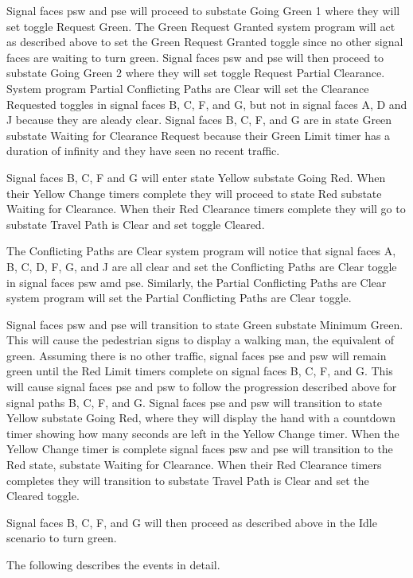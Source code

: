 \documentclass[letterpaper,twoside]{article}
\begin{document}
Signal faces psw and pse will proceed to substate Going Green 1 where
they will set
toggle Request Green.  The Green Request Granted system program will act
as described above to set the Green Request Granted toggle since no other
signal faces are waiting to turn green.  Signal faces psw and pse will then
proceed to substate Going Green 2 where they will set toggle Request Partial
Clearance.  System program Partial Conflicting Paths are Clear will set
the Clearance Requested toggles in signal faces B, C, F, and G,
but not in signal faces A, D and J because they are aleady clear.
Signal faces B, C, F, and G are in state Green substate Waiting for Clearance
Request because their Green Limit timer has a duration of infinity and
they have seen no recent traffic.

Signal faces B, C, F and G will enter state Yellow substate Going Red.
When their Yellow Change timers complete they will proceed to state Red
substate Waiting for Clearance.
When their Red Clearance timers complete they will go
to substate Travel Path is Clear and set toggle Cleared.

The Conflicting Paths are Clear system program will notice that
signal faces A, B, C, D, F, G, and J are all clear and set the
Conflicting Paths are Clear toggle in signal faces psw amd pse.  Similarly,
the Partial Conflicting Paths are Clear system program will set the
Partial Conflicting Paths are Clear toggle.

Signal faces psw and pse will transition to state Green substate Minimum Green.
This will cause the pedestrian signs to display a walking man, the equivalent
of green.  Assuming there is no other traffic, signal faces pse and psw
will remain green
until the Red Limit timers complete on signal faces B, C, F, and G.
This will cause signal faces pse and psw to follow the progression described
above
for signal paths B, C, F, and G.  Signal faces pse and psw will transition
to state Yellow
substate Going Red, where they will display the hand with a countdown timer
showing how many seconds are left in the Yellow Change timer.  When the Yellow
Change timer is complete signal faces psw and pse will transition to the
Red state,
substate Waiting for Clearance.  When their Red Clearance timers completes
they will
transition to substate Travel Path is Clear and set the Cleared toggle.

Signal faces B, C, F, and G will then proceed as described above
in the Idle scenario to turn green.

The following describes the events in detail.
\end{document}
